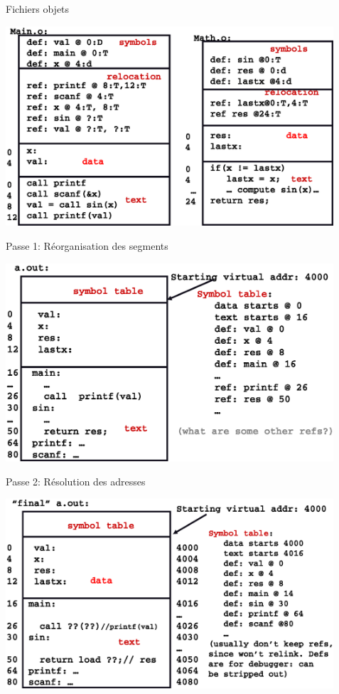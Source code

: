 \documentclass[11pt]{beamer}
\begin{document}
\begin{slide}{Fichiers objets}
\vspace*{-.2in}
\centerline{\includegraphics[width=4.8in]{figs/2mobj}}
\end{slide}

\begin{slide}{Passe 1: Réorganisation des segments}
\vspace*{-.2in}
\centerline{\includegraphics[width=4.8in]{figs/2mreorg}}
\end{slide}

\begin{slide}{Passe 2: Résolution des adresses}
\vspace*{-.2in}
\centerline{\includegraphics[width=4.8in]{figs/2mreloc}}
\end{slide}
\end{document}
